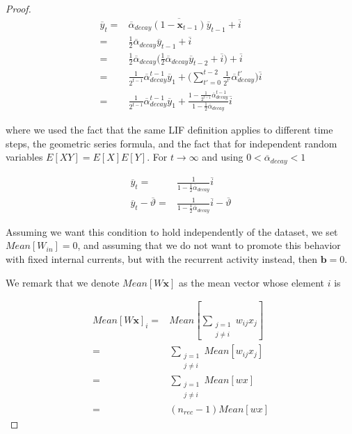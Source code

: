 \begin{proof}
\begin{align}
    \overline{y}_t 
    =&\overline{\alpha}_{decay} \overline{(1-\boldsymbol{x}_{t-1})}\overline{y}_{t-1} + \overline{i} \\
    =&\frac{1}{2}\overline{\alpha}_{decay} \overline{y}_{t-1} + \overline{i} \\
    =&\frac{1}{2}\overline{\alpha}_{decay} \Big(\frac{1}{2}\overline{\alpha}_{decay} \overline{y}_{t-2} + \overline{i}\Big) + \overline{i} \\
    =&\frac{1}{2^{t-1}}\overline{\alpha}_{decay}^{t-1}\overline{y}_{1} + \Big(\sum_{t'=0}^{t-2}\frac{1}{2^{t'}}\overline{\alpha}_{decay}^{t'}\Big)\overline{i} \\
    =&\frac{1}{2^{t-1}}\overline{\alpha}_{decay}^{t-1}\overline{y}_{1}  + \frac{1-\frac{1}{2^{t-1}}\overline{\alpha}_{decay}^{t-1} }{1-\frac{1}{2}\overline{\alpha}_{decay}}\overline{i} 
\end{align}

\noindent where we used the fact that the same LIF definition applies to different time steps, the geometric series formula, and the fact that for independent random variables $E[XY] =E[X]E[Y]$. For $t\rightarrow\infty$ and using  $0<\overline{\alpha}_{decay}<1$

\begin{align}
    \overline{y}_t =&
    \frac{1 }{1-\frac{1}{2}\overline{\alpha}_{decay}}\overline{i} \\
    \overline{y}_t-\overline{\vartheta} =&
    \frac{1 }{1-\frac{1}{2}\overline{\alpha}_{decay}}\overline{i} - \overline{\vartheta} 
\end{align}

Assuming we want this condition to hold independently of the dataset, we set $Mean[W_{in}]=0$, and assuming that we do not want to promote this behavior with fixed internal currents, but with the recurrent activity instead, then $\boldsymbol{b}=0$. 

We remark that we denote $Mean[W\boldsymbol{x}]$ as the mean vector whose element $i$ is

\begin{align}\label{eq:indepx}
    Mean[W\boldsymbol{x}]_i=& Mean[\sum_{\substack{j=1\\j\neq i}} w_{ij}x_j] \\
    =& \sum_{\substack{j=1\\j\neq i}} Mean[ w_{ij}x_j]   \\
    =& \sum_{\substack{j=1\\j\neq i}} Mean[ wx]  \\
    =& (n_{rec}-1) Mean[ wx]   
\end{align}


\end{proof}
